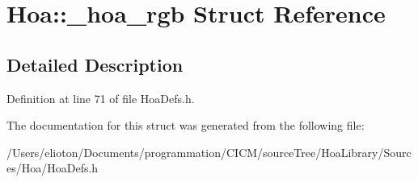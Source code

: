 \hypertarget{struct_hoa_1_1__hoa__rgb}{\section{Hoa\-:\-:\-\_\-hoa\-\_\-rgb Struct Reference}
\label{struct_hoa_1_1__hoa__rgb}
}


\subsection{Detailed Description}


Definition at line 71 of file Hoa\-Defs.\-h.



The documentation for this struct was generated from the following file\-:\begin{DoxyCompactItemize}
\item 
/\-Users/elioton/\-Documents/programmation/\-C\-I\-C\-M/source\-Tree/\-Hoa\-Library/\-Sources/\-Hoa/Hoa\-Defs.\-h\end{DoxyCompactItemize}
